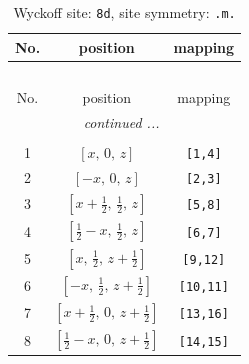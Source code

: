 \documentclass[fleqn,8pt]{jsarticle}
\begin{document}
\begin{longtable}{ccc}
\caption{Wyckoff site: {\tt 8d}, site symmetry: {\tt .m.}}
 \\
 \hline \hline
No. & position & mapping \\ \hline \endfirsthead

\multicolumn{2}{l}{\tablename\ \thetable{}} \\
 \hline \hline
No. & position & mapping \\ \hline \endhead

 \hline \hline
\multicolumn{2}{r}{\footnotesize\it continued ...} \\ \endfoot

 \hline \hline
\multicolumn{2}{r}{} \\ \endlastfoot

1 & $\left[ x,\, 0,\, z \right]$ & {\tt [1,4]} \\ \hline
2 & $\left[ - x,\, 0,\, z \right]$ & {\tt [2,3]} \\ \hline
3 & $\left[ x + \frac{1}{2},\, \frac{1}{2},\, z \right]$ & {\tt [5,8]} \\ \hline
4 & $\left[ \frac{1}{2} - x,\, \frac{1}{2},\, z \right]$ & {\tt [6,7]} \\ \hline
5 & $\left[ x,\, \frac{1}{2},\, z + \frac{1}{2} \right]$ & {\tt [9,12]} \\ \hline
6 & $\left[ - x,\, \frac{1}{2},\, z + \frac{1}{2} \right]$ & {\tt [10,11]} \\ \hline
7 & $\left[ x + \frac{1}{2},\, 0,\, z + \frac{1}{2} \right]$ & {\tt [13,16]} \\ \hline
8 & $\left[ \frac{1}{2} - x,\, 0,\, z + \frac{1}{2} \right]$ & {\tt [14,15]} \\
\end{longtable}
\renewcommand{\arraystretch}{1.2}
\end{document}
